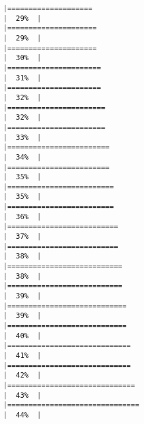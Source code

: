 \documentclass[
]{article}
\begin{document}
\begin{verbatim}
|====================                                                  |  29%  |                                                                              |=====================                                                 |  29%  |                                                                              |=====================                                                 |  30%  |                                                                              |======================                                                |  31%  |                                                                              |======================                                                |  32%  |                                                                              |=======================                                               |  32%  |                                                                              |=======================                                               |  33%  |                                                                              |========================                                              |  34%  |                                                                              |========================                                              |  35%  |                                                                              |=========================                                             |  35%  |                                                                              |=========================                                             |  36%  |                                                                              |==========================                                            |  37%  |                                                                              |==========================                                            |  38%  |                                                                              |===========================                                           |  38%  |                                                                              |===========================                                           |  39%  |                                                                              |============================                                          |  39%  |                                                                              |============================                                          |  40%  |                                                                              |=============================                                         |  41%  |                                                                              |=============================                                         |  42%  |                                                                              |==============================                                        |  43%  |                                                                              |===============================                                       |  44%  |                                                                              
\end{verbatim}
\end{document}
